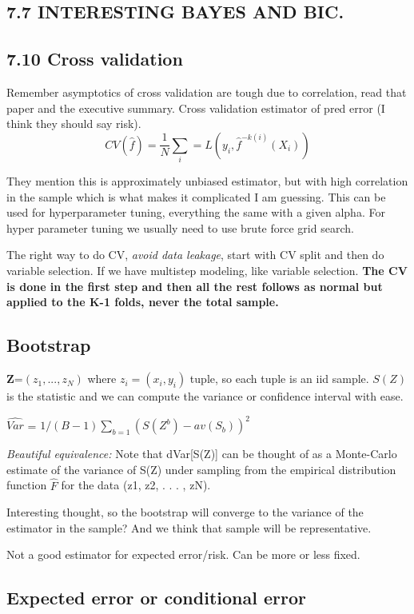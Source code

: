 \documentclass{article}
\begin{document}
\subsection*{7.7 INTERESTING BAYES AND BIC.}


\subsection*{7.10 Cross validation}
Remember asymptotics of cross validation are tough due to correlation, read that paper and the executive summary.
Cross validation estimator of pred error (I think they should say risk). $$CV(\hat{f})=\frac{1}{N}\sum_i=L(y_i,\hat{f}^{-k(i)}(X_i))$$

They mention this is approximately unbiased estimator, but with high correlation in the sample which is what makes it complicated I am guessing.
This can be used for hyperparameter tuning, everything the same with a given alpha. 
For hyper parameter tuning we usually need to use brute force grid search.

The right way to do CV, \textit{avoid data leakage}, start with CV split and then do variable selection. 
If we have multistep modeling, like variable selection. \textbf{The CV is done in the first step and then all the rest follows as normal but applied to the K-1 folds, never the total sample.}

\subsection*{Bootstrap}
\textbf{Z}=$(z_1,...,z_N)$ where $z_i = (x_i,y_i)$ tuple, so each tuple is an iid sample.
$S(Z) $ is the statistic and we can compute the variance or confidence interval with ease.

$\hat{Var}$ = $1/(B-1)\sum_{b=1}(S(Z^b)-av(S_b))^2$

\textit{Beautiful equivalence: }Note that dVar[S(Z)] can be thought of as a
Monte-Carlo estimate of the variance of S(Z) under sampling from the
empirical distribution function  $\hat{F}$ for the data (z1, z2, . . . , zN). 

Interesting thought, so the bootstrap will converge to the variance of the estimator in the sample? And we think that sample will be representative.

Not a good estimator for expected error/risk. Can be more or less fixed.

\subsection*{Expected error or conditional error}
\end{document}
